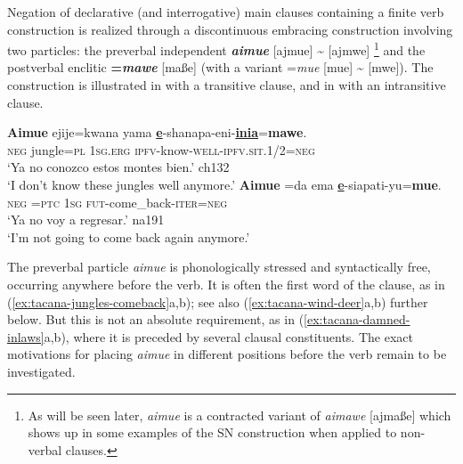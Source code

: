 \documentclass[output=paper]{langsci/langscibook}
\begin{document}
Negation of declarative (and interrogative) main clauses containing a
finite verb construction is realized through a discontinuous embracing
construction involving two particles: the preverbal independent
\textbf{\textit{aimue}} [ajmue] {\textasciitilde} [ajmwe]%
%
    \footnote{As will be seen later, \textit{aimue} is a contracted variant
    of \textit{aimawe} [ajmaße] which shows up in some examples of the SN
    construction when applied to non-verbal clauses.} 
%
and the postverbal enclitic
\textbf{=\textit{mawe}} [maße] (with a variant =\textit{mue} [mue]
{\textasciitilde} [mwe]). The construction is illustrated in
 with a transitive clause, and in
 with an
intransitive clause. 
%
\begin{exe}\ex
\label{ex:tacana-jungles-comeback}      
\begin{xlist}
\ex\label{ex:tacana-jungles}  
\gll \textbf{Aimue}
ejije=kwana
yama
\textbf{\underline{e}}-shanapa-eni-\textbf{\underline{inia}}=\textbf{mawe}.\\
    \textsc{neg}  jungle=\textsc{pl}  \textsc{1sg.erg}
    \textsc{ipfv}-know-\textsc{well-ipfv.sit.}1/2=\textsc{neg}\\
\glt `Ya no conozco estos montes bien.' ch132\\
`I don't know these jungles well anymore.'
\ex\label{ex:tacana-comeback}
\gll  \textbf{Aimue}  =da
ema
\textbf{\underline{e}}-siapati-yu=\textbf{mue}.\\
    \textsc{neg}  \textsc{=ptc}  \textsc{1sg}
    \textsc{fut}-come\_back-\textsc{iter=neg}\\
\glt `Ya no voy a regresar.' na191\\
`I'm not going to come back again anymore.'
\end{xlist}\end{exe}
%
The preverbal particle \textit{aimue} is phonologically stressed and
syntactically free, occurring anywhere before the verb. It is often
the first word of the clause, as in (\ref{ex:tacana-jungles-comeback}a,b);
 see also (\ref{ex:tacana-wind-deer}a,b) further below. But this is not an
absolute requirement, as in (\ref{ex:tacana-damned-inlaws}a,b), where it is
preceded by several clausal constituents. The exact motivations for placing
\textit{aimue} in different positions before the verb remain to be
investigated.
%
\end{document}
